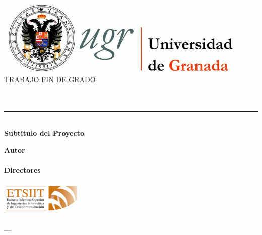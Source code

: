 \thispagestyle{empty}


\begin{titlepage}

  \newlength{\centeroffset}
  \setlength{\centeroffset}{-0.5\oddsidemargin}
  \addtolength{\centeroffset}{0.5\evensidemargin}
  \thispagestyle{empty}

  \noindent\hspace*{\centeroffset}\begin{minipage}{\textwidth}

    \centering
    \includegraphics[width=0.9\textwidth]{gfx/logo_ugr.jpg}\\[1.4cm]

    \textsc{ \Large TRABAJO FIN DE GRADO\\[0.2cm]}
    \textsc{ \myDegree}\\[1cm]
    {\Huge\bfseries \myTitle\\
    }
    \noindent\rule[-1ex]{\textwidth}{3pt}\\[3.5ex]
    {\large\bfseries Subtitulo del Proyecto}
  \end{minipage}

  \vspace{2.5cm}
  \noindent\hspace*{\centeroffset}\begin{minipage}{\textwidth}
    \centering

    \textbf{Autor}\\ {\myName}\\[2.5ex]
    \textbf{Directores}\\
    {\myProf}\\[2cm]
    \includegraphics[width=0.3\textwidth]{gfx/etsiit_logo.png}\\[0.1cm]
    \textsc{\myFaculty}\\
    \textsc{---}\\
    \myTime
  \end{minipage}
  
\end{titlepage}


